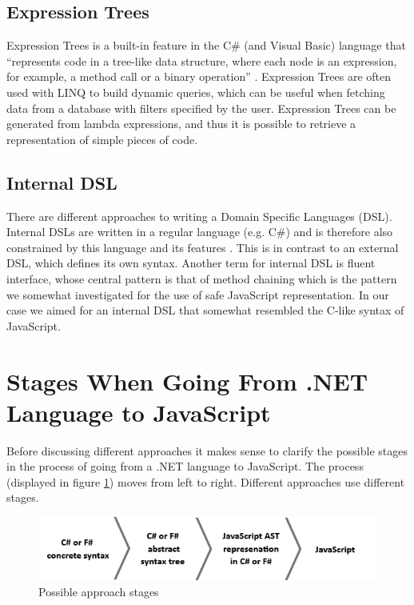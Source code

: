 
	\subsection{Expression Trees} %
	\label{ssub:expression_trees}
			Expression Trees is a built-in feature in the C\# (and Visual Basic) language that ``represents code in a tree-like data structure, where each node is an expression, for example, a method call or a binary operation'' \cite{expression_trees}. Expression Trees are often used with LINQ to build dynamic queries, which can be useful when fetching data from a database with filters specified by the user. Expression Trees can be generated from lambda expressions, and thus it is possible to retrieve a representation of simple pieces of code.

	\subsection{Internal DSL} %
	\label{ssub:internal_dsl}
		There are different approaches to writing a Domain Specific Languages (DSL). Internal DSLs are written in a regular language (e.g. C\#) and is therefore also constrained by this language and its features \cite{domain_specific_languages}. This is in contrast to an external DSL, which defines its own syntax. Another term for internal DSL is fluent interface, whose central pattern is that of method chaining which is the pattern we somewhat investigated for the use of safe JavaScript representation. In our case we aimed for an internal DSL that somewhat resembled the C-like syntax of JavaScript.

\section{Stages When Going From .NET Language to JavaScript} %
\label{sec:stages_when_going_from_net_language_to_javascript}
	Before discussing different approaches it makes sense to clarify the possible stages in the process of going from a .NET language to JavaScript. The process (displayed in figure \ref{stages}) moves from left to right. Different approaches use different stages.

				\begin{figure}[H]
			\begin{center}
				\centerline{\includegraphics[width=14cm]{resources/images/stages.png}}
			\end{center}
			\caption{Possible approach stages}
			\label{stages}
		\end{figure}

